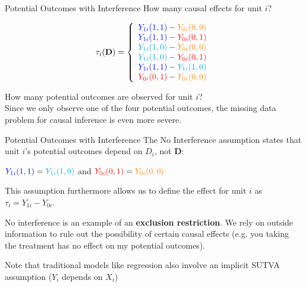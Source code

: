 \documentclass{beamer}
\numberwithin{equation}{section}
\begin{document}
\begin{frame}{Potential Outcomes with Interference}
\small
How many causal effects for unit $i$?

\pause

\begin{small}
\[
\tau_i(\mathbf{D}) = \left\{
 \begin{array}{l}
  \textcolor{blue}{Y_{1i}(1,1)} - \textcolor{orange}{Y_{0i}(0,0)} \\
 \textcolor{blue}{ Y_{1i}(1,1)} - \textcolor{red}{Y_{0i}(0,1)} \\
  \textcolor{cyan}{Y_{1i}(1,0)} - \textcolor{orange}{Y_{0i}(0,0)} \\
\textcolor{cyan}{  Y_{1i}(1,0)} - \textcolor{red}{Y_{0i}(0,1)} \\
 \textcolor{blue}{ Y_{1i}(1,1)} - \textcolor{cyan}{Y_{1i}(1,0)} \\
 \textcolor{red}{ Y_{0i}(0,1)}  - \textcolor{orange}{Y_{0i}(0,0)} \\
 \end{array}
 \right.
\]
\end{small}\medskip

\pause

How many potential outcomes are observed for unit $i$?\\\medskip \pause Since we only observe one of the four potential outcomes, the missing data problem for causal inference is even more severe.

\end{frame}

\begin{frame}{Potential Outcomes with Interference}
\small
The No Interference assumption states that unit $i$'s potential outcomes
depend on $D_i$, not $\mathbf{D}$:\medskip

$\textcolor{blue}{Y_{1i}(1,1)}=\textcolor{cyan}{Y_{1i}(1,0)}$ and
$\textcolor{red}{Y_{0i}(0,1)}=\textcolor{orange}{Y_{0i}(0,0)}$\medskip

This assumption furthermore allows us to define the effect for unit $i$
as $\tau_i = Y_{1i} - Y_{0i}$.\medskip



\pause

No interference is an example of an \textbf{exclusion restriction}. We
rely on outside information to rule out the possibility of certain
causal effects (e.g. you taking the treatment has no effect on my
potential outcomes).\medskip

Note that traditional models like regression also involve an implicit SUTVA assumption ($Y_i$ depends on $X_i$)

\end{frame}
\end{document}
